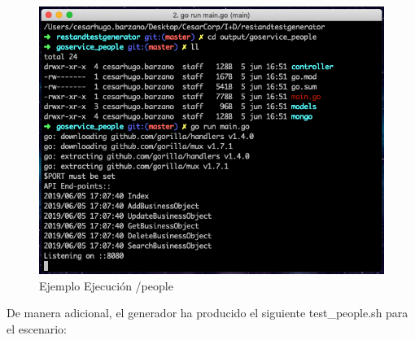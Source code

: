 \documentclass[a4paper,11pt]{book}
\begin{document}
\begin{figure}[H]  
\centering 
\includegraphics[scale=0.35]{imagenes/t13.png}
\caption{ Ejemplo Ejecución /people}  
\end{figure}

De manera adicional, el generador ha producido el siguiente test\_people.sh para el escenario:
\end{document}

